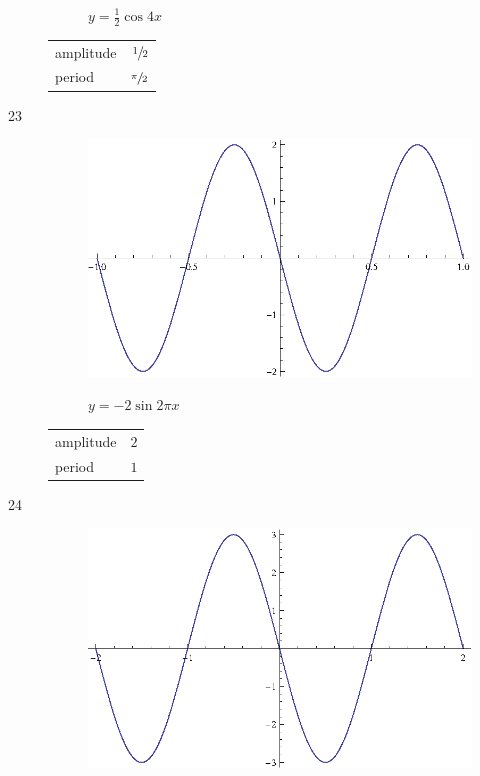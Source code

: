 \documentclass{exam}
\begin{document}
\begin{description}
\begin{figure}[H]
          $y = \frac{1}{2} \cos 4x$
        \end{figure}

        \begin{tabular}[H]{lr}
          \toprule
          amplitude & $\sfrac{1}{2}$ \\
          period    & $\sfrac{\pi}{2}$ \\
          \bottomrule
        \end{tabular}

      \item[23]
        \begin{figure}[H]
          \centering
          \includegraphics[scale=0.9]{exercise23.eps}

          $y = -2 \sin 2 \pi x$
        \end{figure}

        \begin{tabular}[H]{lr}
          \toprule
          amplitude & $2$ \\
          period    & $1$ \\
          \bottomrule
        \end{tabular}

      \item[24]
        \begin{figure}[H]
          \centering
          \includegraphics[scale=0.9]{exercise24.eps}


\end{figure}
\end{description}
\end{document}
